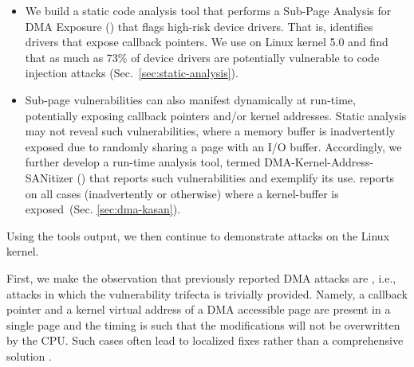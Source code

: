 \begin{itemize}
    \item We build a static code analysis tool that performs a Sub-Page Analysis for DMA Exposure (\tool)  that flags high-risk device drivers. That is, \tool identifies drivers that expose callback pointers.
We use \tool on Linux kernel 5.0 and find that as much as 73\% of device drivers are potentially vulnerable to code injection attacks (Sec.~\ref{sec:static-analysis}). 

    \item Sub-page vulnerabilities can also manifest dynamically at run-time, potentially exposing callback pointers and/or kernel addresses. 
Static analysis may not reveal such vulnerabilities, where a memory buffer is inadvertently exposed due to randomly sharing a page with an I/O buffer. Accordingly, we further develop a run-time analysis tool, termed DMA-Kernel-Address-SANitizer (\dkasan) that reports such vulnerabilities and exemplify its use. \dkasan reports on all cases (inadvertently or otherwise) where a kernel-buffer is exposed~(Sec. \ref{sec:dma-kasan}).
\end{itemize}

Using the tools output, we then continue to demonstrate attacks on the Linux kernel.

First, we make the observation that previously reported DMA attacks are \simple, i.e., attacks in which the vulnerability trifecta is trivially provided. Namely, a callback pointer and a kernel virtual address of a DMA accessible page are present in a single page and the timing is such that the modifications will not be overwritten by the CPU. Such cases often lead to localized fixes rather than a comprehensive solution \cite{thunder}.

